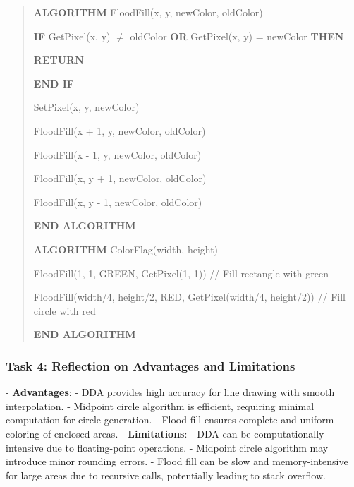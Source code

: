 \documentclass[12pt]{article}
\begin{document}
\begin{quote}
\textbf{ALGORITHM} FloodFill(x, y, newColor, oldColor)

\hspace{1em} \textbf{IF} GetPixel(x, y) $\neq$ oldColor \textbf{OR} GetPixel(x, y) = newColor \textbf{THEN}

\hspace{2em} \textbf{RETURN}

\hspace{1em} \textbf{END IF}

\hspace{1em} SetPixel(x, y, newColor)

\hspace{1em} FloodFill(x + 1, y, newColor, oldColor)

\hspace{1em} FloodFill(x - 1, y, newColor, oldColor)

\hspace{1em} FloodFill(x, y + 1, newColor, oldColor)

\hspace{1em} FloodFill(x, y - 1, newColor, oldColor)

\textbf{END ALGORITHM}

\vspace{1em}

\textbf{ALGORITHM} ColorFlag(width, height)

\hspace{1em} FloodFill(1, 1, GREEN, GetPixel(1, 1)) // Fill rectangle with green

\hspace{1em} FloodFill(width/4, height/2, RED, GetPixel(width/4, height/2)) // Fill circle with red

\textbf{END ALGORITHM}
\end{quote}

\subsubsection*{Task 4: Reflection on Advantages and Limitations}
- \textbf{Advantages}: 
  - DDA provides high accuracy for line drawing with smooth interpolation.
  - Midpoint circle algorithm is efficient, requiring minimal computation for circle generation.
  - Flood fill ensures complete and uniform coloring of enclosed areas.
- \textbf{Limitations}: 
  - DDA can be computationally intensive due to floating-point operations.
  - Midpoint circle algorithm may introduce minor rounding errors.
  - Flood fill can be slow and memory-intensive for large areas due to recursive calls, potentially leading to stack overflow.
\end{document}
